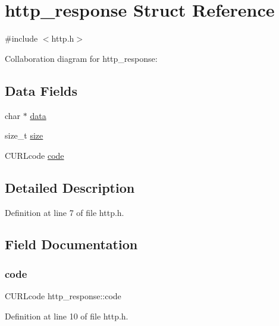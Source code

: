 \hypertarget{structhttp__response}{}\section{http\+\_\+response Struct Reference}
\label{structhttp__response}


{\ttfamily \#include $<$http.\+h$>$}



Collaboration diagram for http\+\_\+response\+:
\subsection*{Data Fields}
\begin{DoxyCompactItemize}
\item 
char $\ast$ \mbox{\hyperlink{structhttp__response_a6d1634ea52b1d8e59a3c6fb387e5b187}{data}}
\item 
size\+\_\+t \mbox{\hyperlink{structhttp__response_a652d9d52a9d94b4e80a591bc42b704f9}{size}}
\item 
C\+U\+R\+Lcode \mbox{\hyperlink{structhttp__response_a2fedfa31ca422712ca9e7d0010afd1f0}{code}}
\end{DoxyCompactItemize}


\subsection{Detailed Description}


Definition at line 7 of file http.\+h.



\subsection{Field Documentation}
\mbox{\label{structhttp__response_a2fedfa31ca422712ca9e7d0010afd1f0}} 
\subsubsection{\texorpdfstring{code}{code}}
{\footnotesize\ttfamily C\+U\+R\+Lcode http\+\_\+response\+::code}



Definition at line 10 of file http.\+h.




